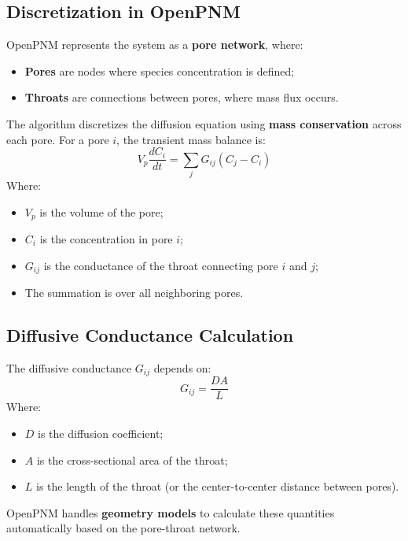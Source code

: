 \documentclass{article}
\begin{document}
\subsection{Discretization in OpenPNM}
OpenPNM represents the system as a \textbf{pore network}, where:
\begin{itemize}
    \item \textbf{Pores} are nodes where species concentration is defined;
    \item \textbf{Throats} are connections between pores, where mass flux occurs.
\end{itemize}
The algorithm discretizes the diffusion equation using \textbf{mass conservation} across each pore.
For a pore $i$, the transient mass balance is:
\begin{equation}
    V_p \frac{d C_i}{d t} = \sum_j G_{ij} (C_j - C_i)
\end{equation}
Where:
\begin{itemize}
    \item $V_p$ is the volume of the pore;
    \item $C_i$ is the concentration in pore $i$;
    \item $G_{ij}$ is the conductance of the throat connecting pore $i$ and $j$;
    \item The summation is over all neighboring pores.
\end{itemize}

\subsection{Diffusive Conductance Calculation}
The diffusive conductance $G_{ij}$ depends on:
\begin{equation}
    G_{ij} = \frac{D A}{L}
\end{equation}
Where:
\begin{itemize}
    \item $D$ is the diffusion coefficient;
    \item $A$ is the cross-sectional area of the throat;
    \item $L$ is the length of the throat (or the center-to-center distance between pores).
\end{itemize}
OpenPNM handles \textbf{geometry models} to calculate these quantities automatically based on the pore-throat network.
\end{document}
